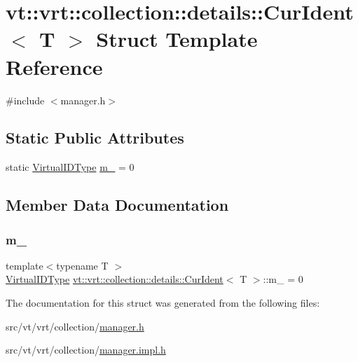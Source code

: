 \hypertarget{structvt_1_1vrt_1_1collection_1_1details_1_1_cur_ident}{}\section{vt\+:\+:vrt\+:\+:collection\+:\+:details\+:\+:Cur\+Ident$<$ T $>$ Struct Template Reference}
\label{structvt_1_1vrt_1_1collection_1_1details_1_1_cur_ident}


{\ttfamily \#include $<$manager.\+h$>$}

\subsection*{Static Public Attributes}
\begin{DoxyCompactItemize}
\item 
static \hyperlink{namespacevt_1_1vrt_a84d0891f52f70728c3fc2172cffb464b}{Virtual\+I\+D\+Type} \hyperlink{structvt_1_1vrt_1_1collection_1_1details_1_1_cur_ident_a3e69ddc9848399a52a673c6ec0a0f68a}{m\+\_\+} = 0
\end{DoxyCompactItemize}


\subsection{Member Data Documentation}
\mbox{\label{structvt_1_1vrt_1_1collection_1_1details_1_1_cur_ident_a3e69ddc9848399a52a673c6ec0a0f68a}} 
\subsubsection{\texorpdfstring{m\+\_\+}{m\_}}
{\footnotesize\ttfamily template$<$typename T $>$ \\
\hyperlink{namespacevt_1_1vrt_a84d0891f52f70728c3fc2172cffb464b}{Virtual\+I\+D\+Type} \hyperlink{structvt_1_1vrt_1_1collection_1_1details_1_1_cur_ident}{vt\+::vrt\+::collection\+::details\+::\+Cur\+Ident}$<$ T $>$\+::m\+\_\+ = 0\hspace{0.3cm}{\ttfamily [static]}}



The documentation for this struct was generated from the following files\+:\begin{DoxyCompactItemize}
\item 
src/vt/vrt/collection/\hyperlink{vrt_2collection_2manager_8h}{manager.\+h}\item 
src/vt/vrt/collection/\hyperlink{vrt_2collection_2manager_8impl_8h}{manager.\+impl.\+h}\end{DoxyCompactItemize}
